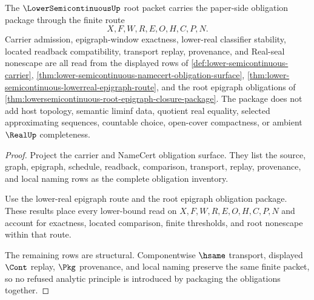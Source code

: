 \begin{theorem}
\label{thm:lower-semicontinuous-obligation-closure-package}
The $\LowerSemicontinuousUp$ root packet carries the paper-side obligation package through the finite route
$$
X,F,W,R,E,O,H,C,P,N .
$$
Carrier admission, epigraph-window exactness, lower-real classifier stability, located readback compatibility, transport replay, provenance, and Real-seal nonescape are all read from the displayed rows of \autoref{def:lower-semicontinuous-carrier}, \autoref{thm:lower-semicontinuous-namecert-obligation-surface}, \autoref{thm:lower-semicontinuous-lowerreal-epigraph-route}, and the root epigraph obligations of \autoref{thm:lowersemicontinuous-root-epigraph-closure-package}. The package does not add host topology, semantic liminf data, quotient real equality, selected approximating sequences, countable choice, open-cover compactness, or ambient $\RealUp$ completeness.
\end{theorem}
\begin{proof}
Project the carrier and NameCert obligation surface. They list the source, graph, epigraph, schedule, readback, comparison, transport, replay, provenance, and local naming rows as the complete obligation inventory.

Use the lower-real epigraph route and the root epigraph obligation package. These results place every lower-bound read on $X,F,W,R,E,O,H,C,P,N$ and account for exactness, located comparison, finite thresholds, and root nonescape within that route.

The remaining rows are structural. Componentwise $\hsame$ transport, displayed $\Cont$ replay, $\Pkg$ provenance, and local naming preserve the same finite packet, so no refused analytic principle is introduced by packaging the obligations together.
\end{proof}

